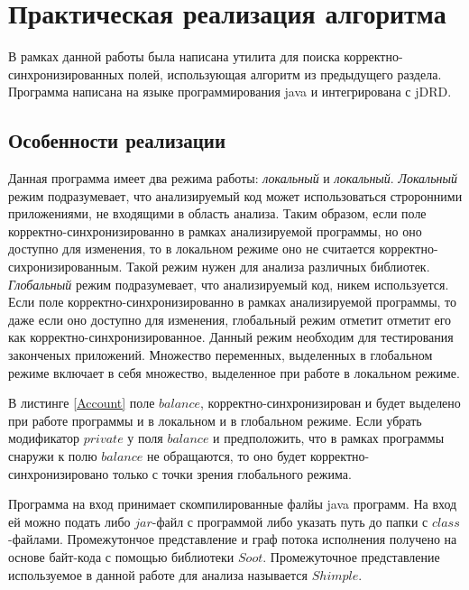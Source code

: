 \chapter{Практическая реализация алгоритма}

В рамках данной работы была написана утилита для поиска корректно-синхронизированных полей, использующая алгоритм из предыдущего раздела. Программа написана на языке программирования java и интегрирована с jDRD.

\FloatBarrier
\section{Особенности реализации}
Данная программа имеет два режима работы: \emph{локальный} и \emph{локальный}. \emph{Локальный} режим подразумевает, что анализируемый код
может использоваться строронними приложениями, не входящими в область анализа. Таким образом, если поле корректно-синхронизированно в рамках анализируемой программы, но оно доступно для изменения, то в локальном режиме оно не считается корректно-сихронизированным. Такой режим нужен для анализа различных библиотек. \emph{Глобальный} режим подразумевает, что 
анализируемый код, никем используется. Если поле корректно-синхронизированно в рамках анализируемой программы, то даже если оно доступно для изменения, глобальный режим отметит отметит его как корректно-синхронизированное. Данный режим необходим для тестирования законченых приложений. Множество переменных, выделенных в глобальном режиме включает в себя множество, выделенное при работе в локальном режиме.



В листинге \ref{Account} поле $balance$, корректно-синхронизирован и будет выделено при работе программы и в локальном и в глобальном режиме. Если убрать модификатор $private$ у поля $balance$ и предположить, что в рамках программы снаружи к полю
$balance$ не обращаются, то оно будет корректно-синхронизировано только с точки зрения глобального режима.



Программа на вход принимает скомпилированные фалйы java программ. На вход ей можно подать либо $jar$-файл с программой либо указать путь до папки с $class$-файлами.  Промежутончое представление и граф потока исполнения получено на основе байт-кода с помощью библиотеки $Soot$. Промежуточное представление используемое в данной работе для анализа называется $Shimple$.


